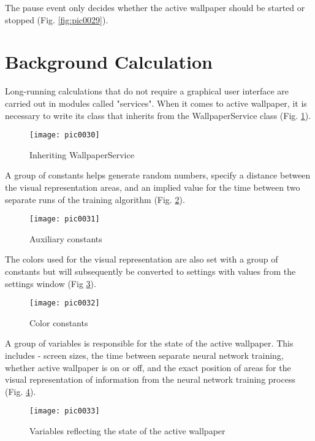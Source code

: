 The pause event only decides whether the active wallpaper should be started or stopped (Fig. \ref{fig:pic0029}).

\section{Background Calculation}

Long-running calculations that do not require a graphical user interface are carried out in modules called "services". When it comes to active wallpaper, it is necessary to write its class that inherits from the WallpaperService class (Fig. \ref{fig:pic0030}).

\begin{figure}[h]
\centering
\texttt{[image: pic0030]}
\caption{Inheriting WallpaperService}
\label{fig:pic0030}
\end{figure}
\FloatBarrier

A group of constants helps generate random numbers, specify a distance between the visual representation areas, and an implied value for the time between two separate runs of the training algorithm (Fig. \ref{fig:pic0031}).

\begin{figure}[h]
\centering
\texttt{[image: pic0031]}
\caption{Auxiliary constants}
\label{fig:pic0031}
\end{figure}
\FloatBarrier

The colors used for the visual representation are also set with a group of constants but will subsequently be converted to settings with values from the settings window (Fig \ref{fig:pic0032}).

\begin{figure}[h]
\centering
\texttt{[image: pic0032]}
\caption{Color constants}
\label{fig:pic0032}
\end{figure}
\FloatBarrier

A group of variables is responsible for the state of the active wallpaper. This includes - screen sizes, the time between separate neural network training, whether active wallpaper is on or off, and the exact position of areas for the visual representation of information from the neural network training process (Fig. \ref{fig:pic0033}).

\begin{figure}[h]
\centering
\texttt{[image: pic0033]}
\caption{Variables reflecting the state of the active wallpaper}
\label{fig:pic0033}
\end{figure}
\FloatBarrier

